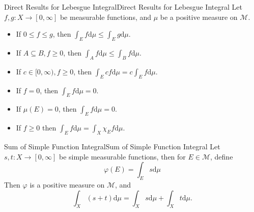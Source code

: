 \documentclass[../main.tex]{subfiles}
\begin{document}
\begin{proposition}{Direct Results for Lebesgue Integral}{Direct Results for Lebesgue Integral}
Let $f,g: X \rightarrow [0,\infty ]$ be measurable functions, and $\mu$ be a positive measure on $\mathcal{M}$.
\begin{itemize}
\item If $0\leq f\leq g$, then $\displaystyle \int_{E}f \mathrm{d} \mu \leq \int_{E}g \mathrm{d} \mu$.
\item If $A \subseteq B,f\geq 0$, then $\displaystyle \int_{A}f \mathrm{d} \mu \leq \int_{B}f \mathrm{d} \mu$.
\item If $c\in [0, \infty ), f\geq 0$, then $\displaystyle \int_{E}c f \mathrm{d} \mu = c \int_{E}f \mathrm{d} \mu$.
\item If $f=0$, then $\displaystyle \int_{E}f \mathrm{d} \mu = 0$.
\item If $\mu(E)=0$, then $\displaystyle \int_{E}f \mathrm{d} \mu = 0$.
\item If $f\geq 0$ then $\displaystyle \int_E f \mathrm{d} \mu = \int_X \chi_E f \mathrm{d} \mu$.
\end{itemize}
\end{proposition}

\begin{proposition}{Sum of Simple Function Integral}{Sum of Simple Function Integral}
	Let $s, t: X \rightarrow [0,\infty ]$ be simple measurable functions, then for $E\in \mathcal{M}$, define
	\begin{equation}
	\varphi(E) = \int_E s \mathrm{d} \mu
	\end{equation}
	Then $\varphi$ is a positive measure on $\mathcal{M}$, and
	\begin{equation}
		\int_X (s+t) \mathrm{d} \mu = \int_X s \mathrm{d} \mu + \int_X t \mathrm{d} \mu.
	\end{equation}
\end{proposition}
\end{document}
